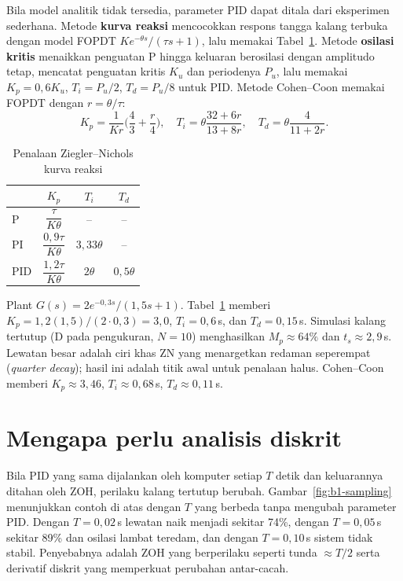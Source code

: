 Bila model analitik tidak tersedia, parameter PID dapat ditala dari eksperimen sederhana. Metode \textbf{kurva reaksi} mencocokkan respons tangga kalang terbuka dengan model FOPDT $Ke^{-\theta s}/(\tau s+1)$, lalu memakai Tabel~\ref{tab:b1-zn}. Metode \textbf{osilasi kritis} menaikkan penguatan P hingga keluaran berosilasi dengan amplitudo tetap, mencatat penguatan kritis $K_u$ dan periodenya $P_u$, lalu memakai $K_p = 0{,}6K_u$, $T_i = P_u/2$, $T_d = P_u/8$ untuk PID. Metode Cohen--Coon memakai FOPDT dengan $r = \theta/\tau$:
\[
	K_p = \frac{1}{Kr}\Big(\frac43 + \frac r4\Big),\quad T_i = \theta\frac{32+6r}{13+8r},\quad T_d = \theta\frac{4}{11+2r}.
\]

\begin{table}[H]
	\centering
	\caption{Penalaan Ziegler--Nichols kurva reaksi}
	\label{tab:b1-zn}
	\renewcommand{\arraystretch}{2.0}
	\begin{tabular}{@{}l c c c@{}}
		\toprule
		 & $K_p$ & $T_i$ & $T_d$ \\
		\midrule
		P & $\dfrac{\tau}{K\theta}$ & -- & -- \\
		PI & $\dfrac{0{,}9\tau}{K\theta}$ & $3{,}33\theta$ & -- \\
		PID & $\dfrac{1{,}2\tau}{K\theta}$ & $2\theta$ & $0{,}5\theta$ \\
		\bottomrule
	\end{tabular}
\end{table}

\begin{contoh}
	Plant $G(s) = 2e^{-0{,}3s}/(1{,}5s+1)$. Tabel~\ref{tab:b1-zn} memberi $K_p = 1{,}2(1{,}5)/(2\cdot0{,}3) = 3{,}0$, $T_i = 0{,}6$\,s, dan $T_d = 0{,}15$\,s. Simulasi kalang tertutup (D pada pengukuran, $N=10$) menghasilkan $M_p \approx 64\%$ dan $t_s \approx 2{,}9$\,s. Lewatan besar adalah ciri khas ZN yang menargetkan redaman seperempat (\textit{quarter decay}); hasil ini adalah titik awal untuk penalaan halus. Cohen--Coon memberi $K_p \approx 3{,}46$, $T_i \approx 0{,}68$\,s, $T_d \approx 0{,}11$\,s.
\end{contoh}

\section{Mengapa perlu analisis diskrit}
Bila PID yang sama dijalankan oleh komputer setiap $T$ detik dan keluarannya ditahan oleh ZOH, perilaku kalang tertutup berubah. Gambar~\ref{fig:b1-sampling} menunjukkan contoh di atas dengan $T$ yang berbeda tanpa mengubah parameter PID. Dengan $T = 0{,}02$\,s lewatan naik menjadi sekitar 74\%, dengan $T = 0{,}05$\,s sekitar 89\% dan osilasi lambat teredam, dan dengan $T = 0{,}10$\,s sistem tidak stabil. Penyebabnya adalah ZOH yang berperilaku seperti tunda $\approx T/2$ serta derivatif diskrit yang memperkuat perubahan antar-cacah.

